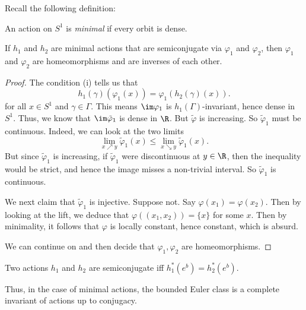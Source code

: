 \documentclass[a4paper]{article}
\begin{document}
Recall the following definition:
\begin{defi}
  An action on $S^1$ is \emph{minimal} if every orbit is dense.
\end{defi}

\begin{lemma}
  If $h_1$ and $h_2$ are minimal actions that are semiconjugate via $\varphi_1$ and $\varphi_2$, then $\varphi_1$ and $\varphi_2$ are homeomorphisms and are inverses of each other.
\end{lemma}

\begin{proof}
  The condition (i) tells us that
  \[
    h_1(\gamma) (\varphi_1(x)) = \varphi_1(h_2(\gamma)(x)).
  \]
  for all $x \in S^1$ and $\gamma \in \Gamma$. This means $\im \varphi_1$ is $h_1(\Gamma)$-invariant, hence dense in $S^1$. Thus, we know that $\im \tilde{\varphi}_1$ is dense in $\R$. But $\tilde{\varphi}$ is increasing. So $\tilde{\varphi}_1$ must be continuous. Indeed, we can look at the two limits
  \[
    \lim_{x \nearrow y} \tilde{\varphi}_1(x) \leq \lim_{x \searrow y} \tilde{\varphi}_1(x).
  \]
  But since $\tilde{\varphi}_1$ is increasing, if $\tilde{\varphi}_1$ were discontinuous at $y \in \R$, then the inequality would be strict, and hence the image misses a non-trivial interval. So $\tilde{\varphi}_1$ is continuous.

  We next claim that $\tilde{\varphi}_1$ is injective. Suppose not. Say $\varphi(x_1) = \varphi(x_2)$. Then by looking at the lift, we deduce that $\varphi((x_1, x_2)) = \{x\}$ for some $x$. Then by minimality, it follows that $\varphi$ is locally constant, hence constant, which is absurd.

  We can continue on and then decide that $\varphi_1, \varphi_2$ are homeomorphisms. %
\end{proof}

\begin{thm}[F. Ghys, 1984]
  Two actions $h_1$ and $h_2$ are semiconjugate iff $h_1^*(e^b) = h_2^*(e^b)$.
\end{thm}
Thus, in the case of minimal actions, the bounded Euler class is a complete invariant of actions up to conjugacy.
\end{document}

